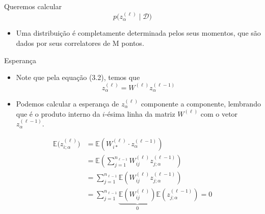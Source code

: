\documentclass{beamer}
\newcommand{\EE}{\mathbb{E}}
\begin{document}
\begin{frame}
	Queremos calcular 
	$$p\big(z^{(\ell)}_\alpha\mid \mathcal{D}\big) $$ 
\begin{itemize}
	\item 
	Uma distribuição é completamente determinada pelos seus momentos, que são dados por seus correlatores de M pontos.
\end{itemize}
\end{frame}

\begin{frame}{Esperança}
	\begin{itemize}
		\item Note que pela equação (3.2), temos que 
		\begin{equation*}\tag{3.2'}
		z^{(\ell)}_{\alpha} = W^{(\ell)} z^{(\ell -1)}_\alpha
		\end{equation*}
		\item Podemos calcular a esperança de $z^{(\ell)}_{\alpha}$ componente a componente, lembrando que é o produto interno da $i$-ésima linha da matriz $W^{(\ell)}$ com o vetor $z^{(\ell -1)}_\alpha$.
	\end{itemize}
\end{frame}
\begin{frame}
	
	\begin{align*}
		\EE\big(z^{(\ell)}_{i;\alpha}\big) &= \EE\left(W_{i*}^{(\ell)} \cdot z^{(\ell -1)}_\alpha\right) \\%
		&= \EE\left(\sum_{j=1}^{n_{\ell-1}} W_{ij}^{(\ell)}z^{(\ell -1)}_{j;\alpha}\right) \\%
		&=\sum_{j=1}^{n_{\ell-1}}\EE\left( W_{ij}^{(\ell)}z^{(\ell -1)}_{j;\alpha}\right) \\%
		&= \sum_{j=1}^{n_{\ell-1}} \underset{0}{\underbrace{\EE\left(W_{ij}^{(\ell)}\right)}} \EE\left(z^{(\ell -1)}_{j;\alpha}\right) = 0 \tag{3.6} %
	\end{align*} 
\end{frame}
\end{document}
